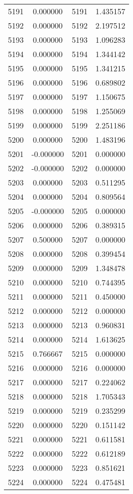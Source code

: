 \documentclass[12pt]{article}
\begin{document}
\begin{longtable}{@{}cccc@{}}
5191 & 0.000000 & 5191 & 1.435157 \\
5192 & 0.000000 & 5192 & 2.197512 \\
5193 & 0.000000 & 5193 & 1.096283 \\
5194 & 0.000000 & 5194 & 1.344142 \\
5195 & 0.000000 & 5195 & 1.341215 \\
5196 & 0.000000 & 5196 & 0.689802 \\
5197 & 0.000000 & 5197 & 1.150675 \\
5198 & 0.000000 & 5198 & 1.255069 \\
5199 & 0.000000 & 5199 & 2.251186 \\
5200 & 0.000000 & 5200 & 1.483196 \\
5201 & -0.000000 & 5201 & 0.000000 \\
5202 & -0.000000 & 5202 & 0.000000 \\
5203 & 0.000000 & 5203 & 0.511295 \\
5204 & 0.000000 & 5204 & 0.809564 \\
5205 & -0.000000 & 5205 & 0.000000 \\
5206 & 0.000000 & 5206 & 0.389315 \\
5207 & 0.500000 & 5207 & 0.000000 \\
5208 & 0.000000 & 5208 & 0.399454 \\
5209 & 0.000000 & 5209 & 1.348478 \\
5210 & 0.000000 & 5210 & 0.744395 \\
5211 & 0.000000 & 5211 & 0.450000 \\
5212 & 0.000000 & 5212 & 0.000000 \\
5213 & 0.000000 & 5213 & 0.960831 \\
5214 & 0.000000 & 5214 & 1.613625 \\
5215 & 0.766667 & 5215 & 0.000000 \\
5216 & 0.000000 & 5216 & 0.000000 \\
5217 & 0.000000 & 5217 & 0.224062 \\
5218 & 0.000000 & 5218 & 1.705343 \\
5219 & 0.000000 & 5219 & 0.235299 \\
5220 & 0.000000 & 5220 & 0.151142 \\
5221 & 0.000000 & 5221 & 0.611581 \\
5222 & 0.000000 & 5222 & 0.612189 \\
5223 & 0.000000 & 5223 & 0.851621 \\
5224 & 0.000000 & 5224 & 0.475481 \\

\end{longtable}
\end{document}

